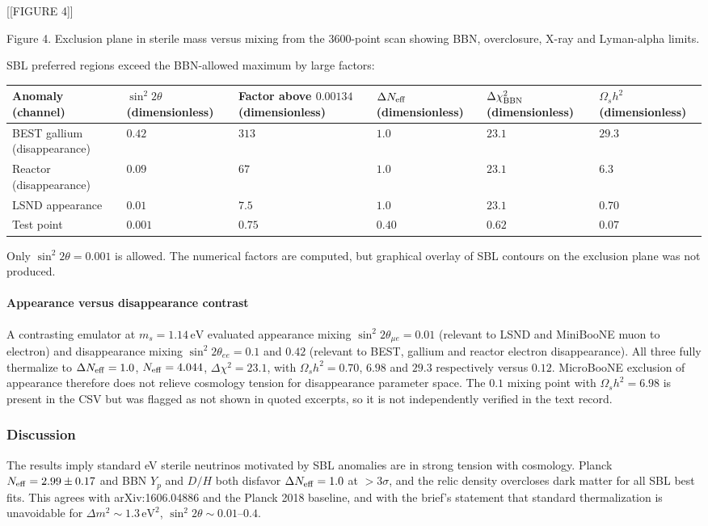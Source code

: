\documentclass[11pt,a4paper]{article}
\begin{document}
[[FIGURE 4]]

Figure 4. Exclusion plane in sterile mass versus mixing from the 3600-point scan showing BBN, overclosure, X-ray and Lyman-alpha limits.

SBL preferred regions exceed the BBN-allowed maximum by large factors:

\begin{longtable}{@{}p{}p{}p{}p{}p{}p{}@{}}
\toprule
\textbf{Anomaly (channel)} & \textbf{$\sin^2 2\theta$ (dimensionless)} & \textbf{Factor above $0.00134$ (dimensionless)} & \textbf{$\Delta N_{\rm eff}$ (dimensionless)} & \textbf{$\Delta \chi^2_{\rm BBN}$ (dimensionless)} & \textbf{$\Omega_s h^2$ (dimensionless)} \\ \midrule \endhead
BEST gallium (disappearance) & $0.42$ & $313$ & $1.0$ & $23.1$ & $29.3$ \\
Reactor (disappearance) & $0.09$ & $67$ & $1.0$ & $23.1$ & $6.3$ \\
LSND appearance & $0.01$ & $7.5$ & $1.0$ & $23.1$ & $0.70$ \\
Test point & $0.001$ & $0.75$ & $0.40$ & $0.62$ & $0.07$ \\
\bottomrule\end{longtable}
Only $\sin^2 2\theta = 0.001$ is allowed. The numerical factors are computed, but graphical overlay of SBL contours on the exclusion plane was not produced.

\paragraph{Appearance versus disappearance contrast}
A contrasting emulator at $m_s = 1.14\,\mathrm{eV}$ evaluated appearance mixing $\sin^2 2\theta_{\mu e} = 0.01$ (relevant to LSND and MiniBooNE muon to electron) and disappearance mixing $\sin^2 2\theta_{ee} = 0.1$ and $0.42$ (relevant to BEST, gallium and reactor electron disappearance). All three fully thermalize to $\Delta N_{\rm eff} = 1.0$, $N_{\rm eff} = 4.044$, $\Delta \chi^2 = 23.1$, with $\Omega_s h^2 = 0.70$, $6.98$ and $29.3$ respectively versus $0.12$. MicroBooNE exclusion of appearance therefore does not relieve cosmology tension for disappearance parameter space. The $0.1$ mixing point with $\Omega_s h^2 = 6.98$ is present in the CSV but was flagged as not shown in quoted excerpts, so it is not independently verified in the text record.

\subsubsection*{Discussion}
The results imply standard eV sterile neutrinos motivated by SBL anomalies are in strong tension with cosmology. Planck $N_{\rm eff} = 2.99 \pm 0.17$ and BBN $Y_p$ and $D/H$ both disfavor $\Delta N_{\rm eff} = 1.0$ at $>3\sigma$, and the relic density overcloses dark matter for all SBL best fits. This agrees with arXiv:1606.04886 and the Planck 2018 baseline, and with the brief's statement that standard thermalization is unavoidable for $\Delta m^2 \sim 1.3\,\mathrm{eV}^2$, $\sin^2 2\theta \sim 0.01$--$0.4$.
\end{document}
